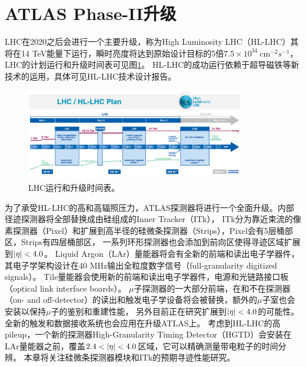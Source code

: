 \section{ATLAS Phase-II升级}
LHC在2020之后会进行一个主要升级，称为High Luminosity LHC（HL-LHC）其将在14 TeV能量下运行，瞬时亮度将达到原始设计目标的5倍$7.5\times10^{34}~\text{cm}^{-2}s^{-1}$，
LHC的计划运行和升级时间表可见图\ref{fig:LHC_timeline}。
HL-LHC的成功运行依赖于超导磁铁等新技术的运用，具体可见HL-LHC技术设计报告\cite{Apollinari:2284929}。
\begin{figure}[h]
\centering
 \includegraphics[width=0.85\textwidth]{fig/HL-LHC-PLAN.png}
 \caption{LHC运行和升级时间表\cite{Apollinari:2284929}。}
 \label{fig:LHC_timeline}
\end{figure}
为了承受HL-LHC的高\pileup 和高辐照压力，ATLAS探测器将进行一个全面升级。内部径迹探测器将全部替换成由硅组成的Inner Tracker（ITk），
ITk分为靠近束流的像素探测器（Pixel）\cite{Collaboration:2285585}和扩展到高半径的硅微条探测器（Strips）\cite{Collaboration:2017mtb}，Pixel会有5层桶部区，Strips有四层桶部区，
一系列环形探测器也会添加到前向区使得寻迹区域扩展到$|\eta|<4.0$。
Liquid Argon（LAr）量能器\cite{Collaboration:2285582}将会有全新的前端和读出电子学器件，其电子学架构设计在40 MHz输出全粒度数字信号（full-granularity digitized signals）。
Tile量能器\cite{Collaboration:2285583}会使用新的前端和读出电子学器件，电源和光链路接口板（optical link interface boards）。
$\mu$子探测器\cite{Collaboration:2285580}的一大部分前端，在和不在探测器（on- and off-detector）的读出和触发电子学设备将会被替换，额外的$\mu$子室也会安装以保持$\mu$子的鉴别和重建性能，
另外目前正在研究扩展到$|\eta|<4.0$的可能性。
全新的触发和数据接收系统\cite{Collaboration:2285584}也会应用在升级ATLAS上。
考虑到HL-LHC的高pileup，一个新的探测器High-Granularity Timing Detector（HGTD）\cite{Collaboration:2623663}会安装在LAr量能器之前，覆盖$2.4<\abseta<4.0$区域，它可以精确测量带电粒子的时间分辨。
本章将关注硅微条探测器模块和ITk的预期寻迹性能研究。

